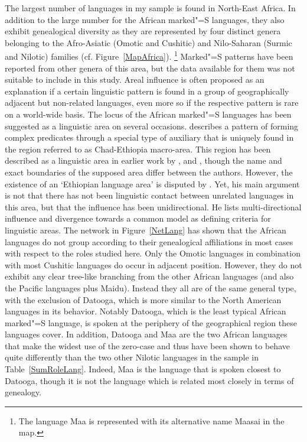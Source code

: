 The largest number of languages in my sample is found in North-East Africa. 
In addition to the large number for the African marked"=S languages, they also exhibit genealogical diversity as they are represented by four distinct genera belonging to the Afro-Asiatic (Omotic and Cushitic) and Nilo-Saharan (Surmic and Nilotic) families (cf. Figure~\ref{MapAfrica}).
\footnote{The language Maa is represented with its alternative name Maasai in the map.} 
Marked"=S patterns have been reported from other genera of this area, but the data available for them was not suitable to include in this study. 
Areal influence is often proposed as an explanation if a certain linguistic pattern is found in a group of geographically adjacent but non-related languages, even more so if the respective pattern is rare on a world-wide basis.
The locus of the African marked"=S languages has been suggested as a linguistic area on several occasions.
\citet{Gueldemann:2005} describes a pattern of forming complex predicates through a special type of auxiliary that is uniquely found in the region referred to as Chad-Ethiopia macro-area. 
This region has been described as a linguistic area in earlier work by \citet{Greenberg:1983}, \citet{Ferguson:1976} and \citet{Heine:1976}, though the name and exact boundaries of the supposed area differ between the authors.
However, the existence of an `Ethiopian language area' is disputed by \citet{Tosco:2000}. 
Yet, his main argument is not that there has not been linguistic contact between unrelated languages in this area, but that the influence has been unidirectional. 
He lists multi-directional influence and divergence towards a common model as defining criteria for linguistic areas. 
The network in Figure~\ref{NetLang} has shown that the African languages do not group according to their genealogical affiliations in most cases with respect to the roles studied here. 
Only the Omotic languages in combination with most Cushitic languages do occur in adjacent position. 
However, they do not exhibit any clear tree-like branching from the other African languages (and also the Pacific languages plus Maidu). %
Instead they all are of the same general type, with the exclusion of Datooga, which is more similar to the North American languages in its behavior. 
Notably Datooga, which is the least typical African marked"=S language, is spoken at the periphery of the geographical region these languages cover.
In addition, Datooga and Maa are the two African languages that make the widest use of the zero-case and thus have been shown to behave quite differently than the two other Nilotic languages in the sample in Table~\ref{SumRoleLang}. 
Indeed, Maa is the language that is spoken closest to Datooga, though it is not the language which is related most closely in terms of genealogy. 



